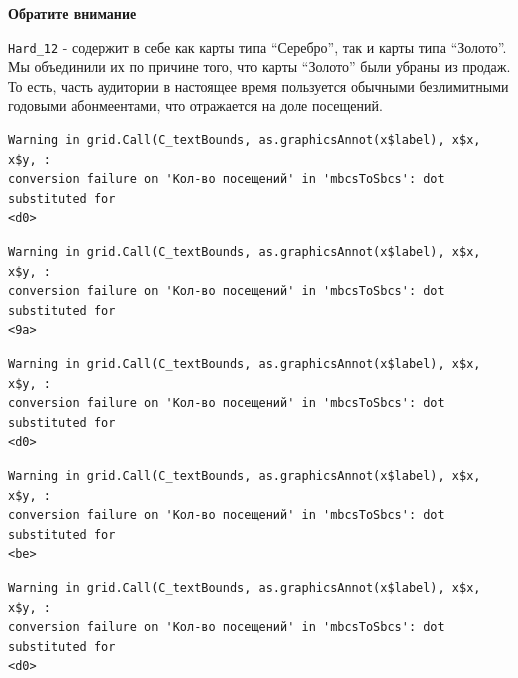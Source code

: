 \documentclass[
  letterpaper,
  DIV=11,
  numbers=noendperiod]{scrartcl}
\begin{document}
\begin{tcolorbox}[enhanced jigsaw, left=2mm, bottomrule=.15mm, opacityback=0, arc=.35mm, colframe=quarto-callout-important-color-frame, rightrule=.15mm, colback=white, toprule=.15mm, breakable, leftrule=.75mm]
\begin{minipage}[t]{5.5mm}
\textcolor{quarto-callout-important-color}{\faExclamation}
\end{minipage}%
\begin{minipage}[t]{\textwidth - 5.5mm}

\textbf{Обратите внимание}\vspace{2mm}

\texttt{Hard\_12} - содержит в себе как карты типа ``Серебро'', так и
карты типа ``Золото''. Мы объединили их по причине того, что карты
``Золото'' были убраны из продаж. То есть, часть аудитории в настоящее
время пользуется обычными безлимитными годовыми абонмеентами, что
отражается на доле посещений.

\end{minipage}%
\end{tcolorbox}

\begin{verbatim}
Warning in grid.Call(C_textBounds, as.graphicsAnnot(x$label), x$x, x$y, :
conversion failure on 'Кол-во посещений' in 'mbcsToSbcs': dot substituted for
<d0>
\end{verbatim}

\begin{verbatim}
Warning in grid.Call(C_textBounds, as.graphicsAnnot(x$label), x$x, x$y, :
conversion failure on 'Кол-во посещений' in 'mbcsToSbcs': dot substituted for
<9a>
\end{verbatim}

\begin{verbatim}
Warning in grid.Call(C_textBounds, as.graphicsAnnot(x$label), x$x, x$y, :
conversion failure on 'Кол-во посещений' in 'mbcsToSbcs': dot substituted for
<d0>
\end{verbatim}

\begin{verbatim}
Warning in grid.Call(C_textBounds, as.graphicsAnnot(x$label), x$x, x$y, :
conversion failure on 'Кол-во посещений' in 'mbcsToSbcs': dot substituted for
<be>
\end{verbatim}

\begin{verbatim}
Warning in grid.Call(C_textBounds, as.graphicsAnnot(x$label), x$x, x$y, :
conversion failure on 'Кол-во посещений' in 'mbcsToSbcs': dot substituted for
<d0>
\end{verbatim}
\end{document}
